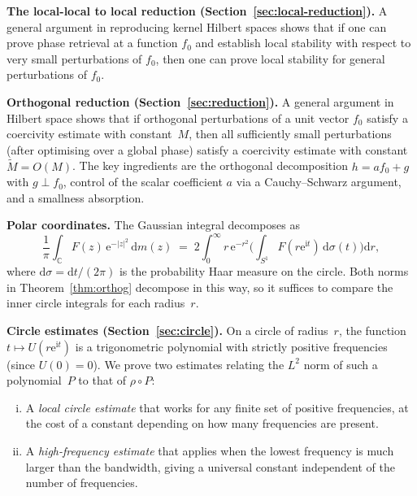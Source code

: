 \documentclass[11pt]{amsart}
\theoremstyle{definition}
\theoremstyle{remark}
\begin{document}
\noindent
\textbf{The local-local to local reduction
(Section~\ref{sec:local-reduction}).}\;
A general argument in reproducing kernel Hilbert spaces shows that if one
can prove phase retrieval at a function \(f_0\) and establish local stability
with respect to very small perturbations of \(f_0\), then one can prove local
stability for general perturbations of \(f_0\).

\medskip
\noindent
\textbf{Orthogonal reduction (Section~\ref{sec:reduction}).}\;
A general argument in Hilbert space shows that if orthogonal perturbations
of a unit vector $f_0$ satisfy a coercivity estimate with constant~$M$,
then all sufficiently small perturbations (after optimising over a global
phase) satisfy a coercivity estimate with constant $\widetilde{M} = O(M)$.
The key ingredients are the orthogonal decomposition $h = af_0 + g$ with
$g \perp f_0$, control of the scalar coefficient $a$ via a Cauchy--Schwarz
argument, and a smallness absorption.

\medskip
\noindent
\textbf{Polar coordinates.}\;
The Gaussian integral decomposes as
\begin{equation}\label{eq:polar}
\frac{1}{\pi}\int_{\mathbb{C}} F(z)\, \mathrm{e}^{-\lvert z \rvert^2}\,\mathrm{d} m(z)
\;=\;
2\int_0^\infty r\,\mathrm{e}^{-r^2}
\biggl(\int_{S^1} F(r\mathrm{e}^{\mathrm{i} t})\,\mathrm{d}\sigma(t)\biggr)\mathrm{d} r,
\end{equation}
where $\mathrm{d}\sigma = \mathrm{d} t/(2\pi)$ is the probability Haar measure on the
circle.  Both norms in Theorem~\ref{thm:orthog} decompose in this way, so it
suffices to compare the inner circle integrals for each radius~$r$.

\medskip
\noindent
\textbf{Circle estimates (Section~\ref{sec:circle}).}\;
On a circle of radius~$r$, the function $t \mapsto U(r\mathrm{e}^{\mathrm{i} t})$ is a
trigonometric polynomial with strictly positive frequencies (since
$U(0) = 0$).  We prove two estimates relating the $L^2$ norm of such a
polynomial~$P$ to that of $\rho \circ P$:
\begin{enumerate}[(i)]
\item A \emph{local circle estimate} that works for any finite set of
  positive frequencies, at the cost of a constant depending on how many
  frequencies are present.

\item A \emph{high-frequency estimate} that applies when the lowest
  frequency is much larger than the bandwidth, giving a universal constant
  independent of the number of frequencies.
\end{enumerate}
\end{document}
